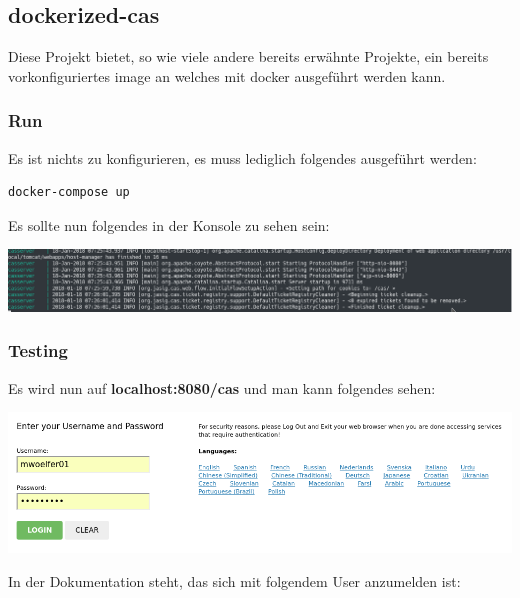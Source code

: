 \subsection{dockerized-cas}
\cite{J-fuentes}

Diese Projekt bietet, so wie viele andere bereits erwähnte Projekte, ein bereits vorkonfiguriertes image an welches mit docker ausgeführt werden kann.

\subsubsection{Run}
Es ist nichts zu konfigurieren, es muss lediglich folgendes ausgeführt werden:

\begin{lstlisting}[language=bash]
docker-compose up
\end{lstlisting}

Es sollte nun folgendes in der Konsole zu sehen sein:

\begin{minipage}{\linewidth}
	\centering
	\includegraphics[width=1\linewidth]{images/funzt_1}
\end{minipage}

\clearpage

\subsubsection{Testing}
Es wird nun auf \textbf{localhost:8080/cas} und man kann folgendes sehen:

\begin{minipage}{\linewidth}
	\centering
	\includegraphics[width=1\linewidth]{images/funzt_2}
\end{minipage}

In der Dokumentation steht, das sich mit folgendem User anzumelden ist:

